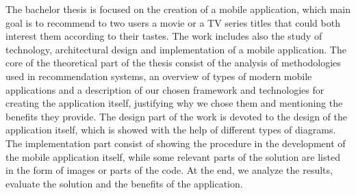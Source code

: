 The bachelor thesis is focused on the creation of a mobile application, which main goal is to recommend to two users a movie or a TV series titles that could both interest them according to their tastes. The work includes also the study of technology, architectural design and implementation of a mobile application.
The core of the theoretical part of the thesis consist of the analysis of methodologies used in recommendation systems, an overview of types of modern mobile applications and a description of our chosen framework and technologies for creating the application itself, justifying why we chose them and mentioning the benefits they provide.
The design part of the work is devoted to the design of the application itself, which is showed with the help of different types of diagrams.
The implementation part consist of showing the procedure in the development of the mobile application itself, while some relevant parts of the solution are listed in the form of images or parts of the code. At the end, we analyze the results, evaluate the solution and the benefits of the application.